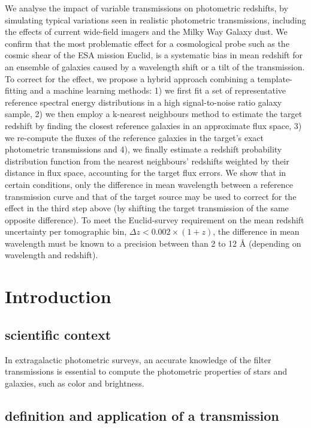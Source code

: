 \documentclass[11pt]{article}
\begin{document}
We analyse the impact of variable transmissions on photometric
redshifts, by simulating typical variations seen in realistic
photometric transmissions, including the effects of current wide-field
imagers and the Milky Way Galaxy dust. We confirm that the most
problematic effect for a cosmological probe such as the cosmic shear of
the ESA mission Euclid, is a systematic bias in mean redshift for an
ensemble of galaxies caused by a wavelength shift or a tilt of the
transmission. To correct for the effect, we propose a hybrid approach
combining a template-fitting and a machine learning methods: 1) we first
fit a set of representative reference spectral energy distributions in a
high signal-to-noise ratio galaxy sample, 2) we then employ a k-nearest
neighbours method to estimate the target redshift by finding the closest
reference galaxies in an approximate flux space, 3) we re-compute the
fluxes of the reference galaxies in the target's exact photometric
transmissions and 4), we finally estimate a redshift probability
distribution function from the nearest neighbours' redshifts weighted by
their distance in flux space, accounting for the target flux errors. We
show that in certain conditions, only the difference in mean wavelength
between a reference transmission curve and that of the target source may
be used to correct for the effect in the third step above (by shifting
the target transmission of the same opposite difference). To meet the
Euclid-survey requirement on the mean redshift uncertainty per
tomographic bin, \(\Delta z <0.002\times(1+z)\), the difference in mean
wavelength must be known to a precision between than 2 to 12 \AA{}
(depending on wavelength and redshift).

    \section{Introduction}\label{introduction}

\subsection{scientific context}\label{scientific-context}

In extragalactic photometric surveys, an accurate knowledge of the
filter transmissions is essential to compute the photometric properties
of stars and galaxies, such as color and brightness.

\subsection{definition and application of a
transmission}\label{definition-and-application-of-a-transmission}
\end{document}
